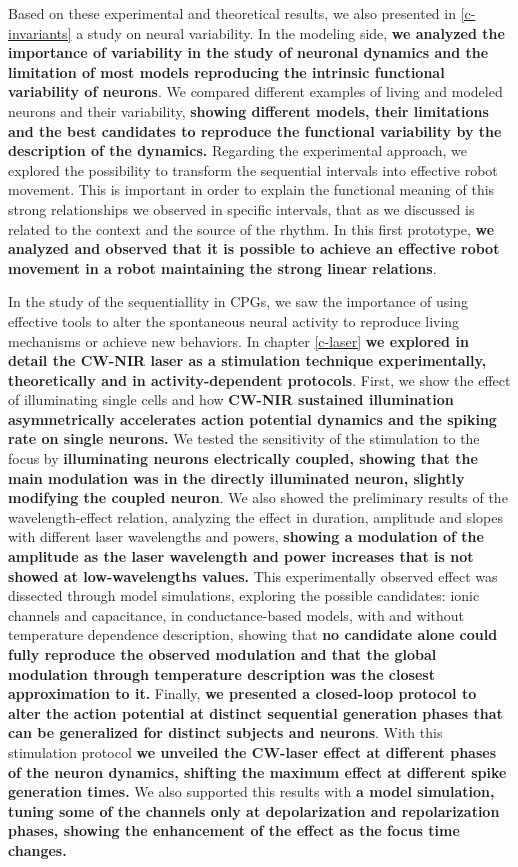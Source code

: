 Based on these experimental and theoretical results, we also presented in \ref{c-invariants} a study on neural variability. In the modeling side, \textbf{we analyzed the importance of variability in the study of neuronal dynamics and the limitation of most models reproducing the intrinsic functional variability of neurons}. We compared different examples of living and modeled neurons and their variability, \textbf{showing different models, their limitations and the best candidates to reproduce the functional variability by the description of the dynamics.} Regarding the experimental approach, we explored the possibility to transform the sequential intervals into effective robot movement. This is important in order to explain the functional meaning of this strong relationships we observed in specific intervals, that as we discussed is related to the context and the source of the rhythm. In this first prototype, \textbf{we analyzed and observed that it is possible to achieve an effective robot movement in a robot maintaining the strong linear relations}.

In the study of the sequentiallity in CPGs, we saw the importance of using effective tools to alter the spontaneous neural activity to reproduce living mechanisms or achieve new behaviors. In chapter \ref{c-laser} \textbf{we explored in detail the CW-NIR laser as a stimulation technique experimentally, theoretically and in activity-dependent protocols}. First, we show the effect of illuminating single cells and how \textbf{CW-NIR sustained illumination asymmetrically accelerates action potential dynamics and the spiking rate on single neurons.} We tested the sensitivity of the stimulation to the focus by \textbf{illuminating neurons electrically coupled, showing that the main modulation was in the directly illuminated neuron, slightly modifying the coupled neuron}. We also showed the preliminary results of the wavelength-effect relation, analyzing the effect in duration, amplitude and slopes with different laser wavelengths and powers, \textbf{showing a modulation of the amplitude as the laser wavelength and power increases that is not showed at low-wavelengths values.} This experimentally observed effect was dissected through model simulations, exploring the possible candidates: ionic channels and capacitance, in conductance-based models, with and without temperature dependence description, showing that \textbf{no candidate alone could fully reproduce the observed modulation and that the global modulation through temperature description was the closest approximation to it.} Finally, \textbf{we presented a closed-loop protocol to alter the action potential at distinct sequential generation phases that can be generalized for distinct subjects and neurons}. With this stimulation protocol \textbf{we unveiled the CW-laser effect at different phases of the neuron dynamics, shifting the maximum effect at different spike generation times.} We also supported this results with \textbf{a model simulation, tuning some of the channels only at depolarization and repolarization phases, showing the enhancement of the effect as the focus time changes.}

